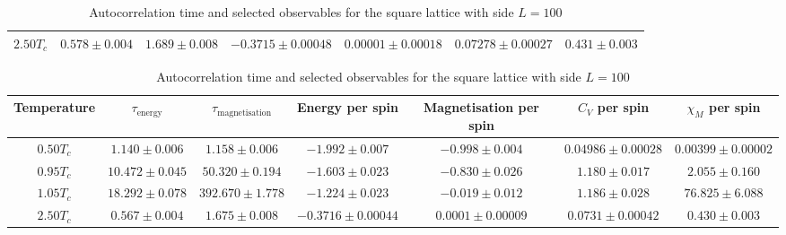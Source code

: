 \begin{sidewaystable}[h!]
\begin{tabular}{|c|c|c|c|c|c|c|}
        \hline
        $2.50 T_c$ & $0.578 \pm 0.004$ & $1.689 \pm 0.008$ & $-0.3715 \pm 0.00048$ & $0.00001 \pm 0.00018$ & $0.07278 \pm 0.00027$ & $0.431 \pm 0.003$ \\
        \hline
    \end{tabular}
    \caption{Autocorrelation time and selected observables for the square lattice with side $L = 50$}
    \label{lec5:results_side50}
    \vspace{30pt}
    \centering
    \begin{tabular}{|c|c|c|c|c|c|c|}
        \hline
        Temperature & 
        $\tau_\text{energy}$ & 
        $\tau_\text{magnetisation}$ & 
        Energy per spin & 
        Magnetisation per spin & 
        $C_V$ per spin & 
        $\chi_M$ per spin \\ 
        \hline
        $0.50 T_c$ & $1.140 \pm 0.006$ & $1.158 \pm 0.006$ & $-1.992 \pm 0.007$ & $-0.998 \pm 0.004$ & $0.04986 \pm 0.00028$ & $0.00399 \pm 0.00002$ \\
        \hline
        $0.95 T_c$ & $10.472 \pm 0.045$ & $50.320 \pm 0.194$ & $-1.603 \pm 0.023$ & $-0.830 \pm 0.026$ & $1.180 \pm 0.017$ & $2.055 \pm 0.160$ \\
        \hline
        $1.05 T_c$ & $18.292 \pm 0.078$ & $392.670 \pm 1.778$ & $-1.224 \pm 0.023$ & $-0.019 \pm 0.012$ & $1.186 \pm 0.028$ & $76.825 \pm 6.088$ \\
        \hline
        $2.50 T_c$ & $0.567 \pm 0.004$ & $1.675 \pm 0.008$ & $-0.3716 \pm 0.00044$ & $0.0001 \pm 0.00009$ & $0.0731 \pm 0.00042$ & $0.430 \pm 0.003$ \\
        \hline
    \end{tabular}
    \caption{Autocorrelation time and selected observables for the square lattice with side $L = 100$}
    \label{lec5:results_side100}
\end{sidewaystable}

